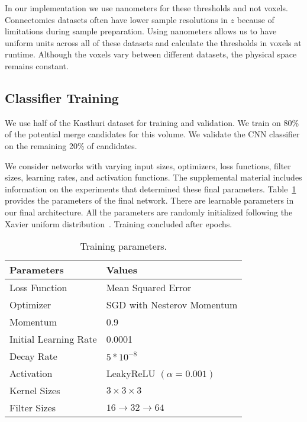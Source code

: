 In our implementation we use nanometers for these thresholds and not voxels. 
Connectomics datasets often have lower sample resolutions in $z$ because of limitations during sample preparation. 
Using nanometers allows us to have uniform units across all of these datasets and calculate the thresholds in voxels at runtime.
Although the voxels vary between different datasets, the physical space remains constant. 


\subsection{Classifier Training}
\label{sec:network-parameters}

We use half of the Kasthuri dataset for training and validation. 
We train on 80\% of the potential merge candidates for this volume.
We validate the CNN classifier on the remaining 20\% of candidates. 

We consider networks with varying input sizes, optimizers, loss functions, filter sizes, learning rates, and activation functions. 
The supplemental material includes information on the experiments that determined these final parameters. 
Table~\ref{table:architecture} provides the parameters of the final network. 
There are  learnable parameters in our final architecture. 
All the parameters are randomly initialized following the Xavier uniform distribution~\cite{glorot2010understanding}. 
Training concluded after  epochs.

\begin{table}[h!]
	\centering
	\begin{tabular}{l l} \hline
		\textbf{Parameters} & \textbf{Values} \\ \hline
		Loss Function & Mean Squared Error \\
		Optimizer & SGD  with Nesterov Momentum \\
		Momentum & 0.9 \\
		Initial Learning Rate & 0.0001 \\
		Decay Rate & $5 * 10^{-8}$ \\
		Activation & LeakyReLU $(\alpha = 0.001)$ \\
		Kernel Sizes & $3 \times 3 \times 3$ \\
		Filter Sizes & $16 \to 32 \to 64$ \\ \hline
	\end{tabular}
	\caption{Training parameters.}
	\label{table:architecture}
\end{table}

